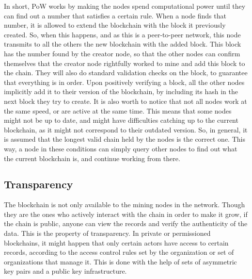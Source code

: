     In short, PoW works by making the nodes spend computational power until they can find out a number that satisfies a certain rule. %
    When a node finds that number, it is allowed to extend the blockchain with the block it previously created. So, when this happens, and as this is a peer-to-peer network, this node transmits to all the others the new blockchain with the added block. This block has the number found by the creator node, so that the other nodes can confirm themselves that the creator node rightfully worked to mine and add this block to the chain. They will also do standard validation checks on the block, to guarantee that everything is in order. Upon positively verifying a block, all the other nodes implicitly add it to their version of the blockchain, by including its hash in the next block they try to create. 
    It is also worth to notice that not all nodes work at the same speed, or are active at the same time. This means that some nodes might not be up to date, and might have difficulties catching up to the current blockchain, as it might not correspond to their outdated version. So, in general, it is assumed that the longest valid chain held by the nodes is the correct one. This way, a node in these conditions can simply query other nodes to find out what the current blockchain is, and continue working from there.
    
    \subsection{Transparency}
   The blockchain is not only available to the mining nodes in the network. Though they are the ones who actively interact with the chain in order to make it grow, if the chain is public, anyone can view the records and verify the authenticity of the data. This is the property of transparency. In private or permissioned blockchains, it might happen that only certain actors have access to certain records, according to the access control rules set by the organization or set of organizations that manage it. This is done with the help of sets of asymmetric key pairs and a public key infrastructure.
    


